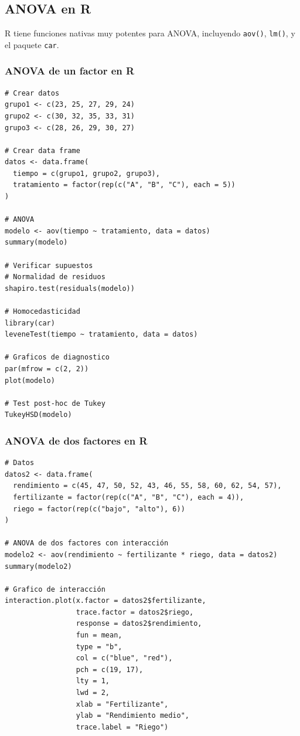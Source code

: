 \documentclass[11pt,a4paper]{article}
\theoremstyle{definition}
\begin{document}
\subsection{ANOVA en R}

R tiene funciones nativas muy potentes para ANOVA, incluyendo \texttt{aov()}, \texttt{lm()}, y el paquete \texttt{car}.

\subsubsection{ANOVA de un factor en R}

\begin{lstlisting}[style=rstyle, caption=ANOVA de un factor en R]
# Crear datos
grupo1 <- c(23, 25, 27, 29, 24)
grupo2 <- c(30, 32, 35, 33, 31)
grupo3 <- c(28, 26, 29, 30, 27)

# Crear data frame
datos <- data.frame(
  tiempo = c(grupo1, grupo2, grupo3),
  tratamiento = factor(rep(c("A", "B", "C"), each = 5))
)

# ANOVA
modelo <- aov(tiempo ~ tratamiento, data = datos)
summary(modelo)

# Verificar supuestos
# Normalidad de residuos
shapiro.test(residuals(modelo))

# Homocedasticidad
library(car)
leveneTest(tiempo ~ tratamiento, data = datos)

# Graficos de diagnostico
par(mfrow = c(2, 2))
plot(modelo)

# Test post-hoc de Tukey
TukeyHSD(modelo)
\end{lstlisting}

\subsubsection{ANOVA de dos factores en R}

\begin{lstlisting}[style=rstyle, caption=ANOVA de dos factores en R]
# Datos
datos2 <- data.frame(
  rendimiento = c(45, 47, 50, 52, 43, 46, 55, 58, 60, 62, 54, 57),
  fertilizante = factor(rep(c("A", "B", "C"), each = 4)),
  riego = factor(rep(c("bajo", "alto"), 6))
)

# ANOVA de dos factores con interacción
modelo2 <- aov(rendimiento ~ fertilizante * riego, data = datos2)
summary(modelo2)

# Grafico de interacción
interaction.plot(x.factor = datos2$fertilizante,
                 trace.factor = datos2$riego,
                 response = datos2$rendimiento,
                 fun = mean,
                 type = "b",
                 col = c("blue", "red"),
                 pch = c(19, 17),
                 lty = 1,
                 lwd = 2,
                 xlab = "Fertilizante",
                 ylab = "Rendimiento medio",
                 trace.label = "Riego")
\end{lstlisting}
\end{document}
